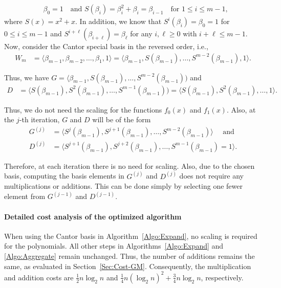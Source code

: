 \begin{equation*}
	\begin{aligned}
		&\beta_{0}=1 \quad \text{and } S(\beta_{i})=\beta_{i}^2+\beta_{i}=\beta_{i-1} \quad \text{for } 1\leq i \leq m-1,
	\end{aligned}
\end{equation*}
where $S(x)=x^2+x$. In addition, we know that $S^{i}(\beta_{i})=\beta_{0}=1$ for $0 \leq i \leq m-1$ and $S^{i+\ell}(\beta_{i+\ell})=\beta_{\ell}$ for any $i,\ell \geq 0$ with $i+\ell\leq m-1$. Now, consider the Cantor special basis in the reversed order, i.e.,
\begin{equation*}
	\begin{aligned}
		W_m
		&= \langle \beta_{m-1},\beta_{m-2},\ldots,\beta_{1},1  \rangle= \langle \beta_{m-1},S(\beta_{m-1}),\ldots,S^{m-2}(\beta_{m-1}),1  \rangle.
	\end{aligned}
\end{equation*}

Thus, we have $G= \langle \beta_{m-1},S(\beta_{m-1}),\ldots,S^{m-2}(\beta_{m-1}))$ and 
\begin{equation*}
	\begin{aligned}
		D
		&= \langle S(\beta_{m-1}),S^2(\beta_{m-1}),\ldots,S^{m-1}(\beta_{m-1}))
		= \langle S(\beta_{m-1}),S^2(\beta_{m-1}),\ldots,1 \rangle.
	\end{aligned}
\end{equation*}

Thus, we do not need the scaling for the functions $f_0(x)$ and $f_1(x)$. Also, at the $j$-th iteration, $G$ and $D$ will be of the form 
\begin{equation*}
	\begin{aligned}
		G^{(j)}
		&= \langle S^{j}(\beta_{m-1}),S^{j+1}(\beta_{m-1}),\ldots,S^{m-2}(\beta_{m-1}) \rangle \quad \text{ and } \\
		D^{(j)}
		&= \langle S^{j+1}(\beta_{m-1}),S^{j+2}(\beta_{m-1}),\ldots,S^{m-1}(\beta_{m-1})=1 \rangle.
	\end{aligned}
\end{equation*}

Therefore, at each iteration there is no need for scaling. Also, due to the chosen basis, computing the basis elements in $G^{(j)}$ and $D^{(j)}$ does not require any multiplications or additions. This can be done simply by selecting one fewer element from $G^{(j-1)}$ and $D^{(j-1)}$.

\paragraph{Detailed cost analysis of the optimized algorithm} When using the Cantor basis in Algorithm~\ref{Algo:Expand}, no scaling is required for the polynomials. All other steps in Algorithms~\ref{Algo:Expand} and \ref{Algo:Aggregate} remain unchanged. Thus, the number of additions remains the same, as evaluated in Section~\ref{Sec:Cost-GM}. Consequently, the multiplication and addition costs are $\frac{1}{2}n\log_2n$ and $\frac{1}{4}n(\log_2 n)^2 + \frac{3}{4}n\log_2 n$, respectively.

